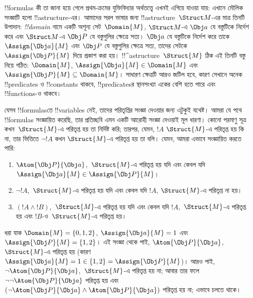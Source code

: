 \documentclass[../../../include/open-logic-section]{subfiles}
\begin{document}


!!{formula}s কী তা জানা হয়ে গেলে প্রথম-ক্রমের যুক্তিবিদ্যার অর্থতত্ত্বে
এখনই এগিয়ে যাওয়া যায়: এখানে মৌলিক সংজ্ঞাটি হলো !!a{structure}-এর।
আমাদের সরল ভাষার জন্য !!a{structure}~$\Struct M$-এর মাত্র তিনটি উপাদান:
\emph{!!{domain}} নামে একটি অশূন্য সেট~$\Domain{M}$,
$\Struct M$-এ $\Obj a$ যে বস্তুটিকে নির্দেশ করে এবং $\Struct M$-এ
$\Obj P$ যে বস্তুগুলির ক্ষেত্রে সত্য। $\Obj a$ যে বস্তুটিকে নির্দেশ করে
তাকে~$\Assign{\Obj a}{M}$ এবং $\Obj P$ যে বস্তুগুলির ক্ষেত্রে সত্য,
তাদের সেটকে~$\Assign{\Obj P}{M}$ দিয়ে প্রকাশ করা হয়। !!^a{structure}~$\Struct{M}$
ঠিক এই তিনটি বস্তু নিয়ে গঠিত: $\Domain{M}$,
$\Assign{\Obj a}{M} \in \Domain{M}$ এবং $\Assign{\Obj P}{M} \subseteq
\Domain{M}$। সাধারণ ক্ষেত্রটি আরও জটিল হবে, কারণ সেখানে অনেক
!!{predicate}s ও !!{constant}s থাকবে, !!{predicate}sর স্থানসংখ্যা একের
বেশি হতে পারে এবং !!{function}s-ও থাকবে।

যেসব !!{formula}sতে !!{variable}s নেই, তাদের পরিতৃপ্তির সংজ্ঞা দেওয়ার
জন্য এটুকুই যথেষ্ট। আমরা যে পথে !!{formula}s সংজ্ঞায়িত করেছি, তার
প্রতিচ্ছবি এমন একটি আরোহী সংজ্ঞা দেওয়াই মূল ধারণা। কোনো পরমাণু সূত্র
কখন~$\Struct{M}$-এ পরিতৃপ্ত হয় তা নির্দিষ্ট করি; তারপর, যেমন, $!A$
$\Struct{M}$-এ পরিতৃপ্ত হয় কি না, তার ভিত্তিতে $\lnot !A$ কখন
$\Struct{M}$-এ পরিতৃপ্ত হয় তা বলি। যেমন, আমরা এভাবে সংজ্ঞায়িত করতে
পারি:
\begin{enumerate}
  \item $\Atom{\Obj P}{\Obj a}$,~$\Struct{M}$-এ পরিতৃপ্ত হয় যদি এবং
  কেবল যদি $\Assign{\Obj a}{M} \in \Assign{\Obj P}{M}$।
  \item $\lnot !A$,~$\Struct{M}$-এ পরিতৃপ্ত হয় যদি এবং কেবল যদি $!A$,
  $\Struct{M}$-এ পরিতৃপ্ত না হয়।
  \item $(!A \land !B)$,~$\Struct{M}$-এ পরিতৃপ্ত হয় যদি এবং কেবল যদি
  $!A$,~$\Struct{M}$-এ পরিতৃপ্ত হয় এবং $!B$-ও~$\Struct{M}$-এ পরিতৃপ্ত
  হয়।
\end{enumerate}
ধরা যাক $\Domain{M} = \{0, 1, 2\}$, $\Assign{\Obj a}{M} = 1$ এবং
$\Assign{\Obj P}{M} = \{1, 2\}$। এই সংজ্ঞা থেকে পাই,
$\Atom{\Obj P}{\Obj a}$,~$\Struct{M}$-এ পরিতৃপ্ত হয় (কারণ
$\Assign{\Obj a}{M} =  1 \in \{1,2\} = \Assign{\Obj P}{M}$)। আরও পাই,
$\lnot \Atom{\Obj P}{\Obj a}$,~$\Struct{M}$-এ পরিতৃপ্ত হয় না; আবার তার
ফলে $\lnot\lnot \Atom{\Obj P}{\Obj a}$ পরিতৃপ্ত হয় এবং
$(\lnot \Atom{\Obj P}{\Obj a} \land \Atom{\Obj P}{\Obj a})$ পরিতৃপ্ত
হয় না; এভাবে চলতে থাকে।
\end{document}
